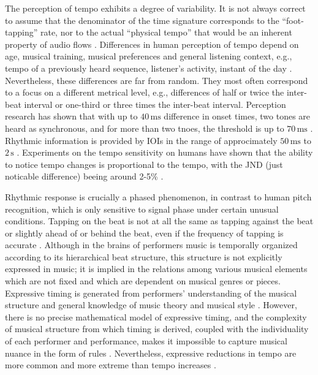 \documentclass{scrartcl}
\begin{document}
The perception of tempo exhibits a degree of variability. It is not always correct to assume that the denominator of the time signature corresponds to the ``foot-tapping'' rate, nor to the actual ``physical tempo'' that would be an inherent property of audio flows \cite{Drake1999}. Differences in human perception of tempo depend on age, musical training, musical preferences and general listening context, e.g., tempo of a previously heard sequence, listener's activity, instant of the day \cite{Drake1993,Drake2000,Drake2000b}. Nevertheless, these differences are  far from random. They most often correspond to a focus on a different metrical level, e.g., differences of half or twice the inter-beat interval or one-third or three times the inter-beat interval. Perception research has shown that with up to $40\,\text{ms}$ difference in onset times, two tones are heard as synchronous, and for more than two tnoes, the threshold is up to $70\,\text{ms}$ \cite{Handel1989}. Rhythmic information is provided by IOIs in the range of approcimately $50\,\text{ms}$ to $2\,\text{s}$ \cite{Handel1989}. Experiments on the tempo sensitivity on humans have shown that the ability to notice tempo changes is proportional to the tempo, with the JND (just noticable difference) beeing around 2-5\% \cite{Drake1993}.

Rhythmic response is crucially a phased phenomenon, in contrast to human pitch recognition, which is only sensitive to signal phase under certain unusual conditions. Tapping on the beat is not at all the same as tapping against the beat or slightly ahead of or behind the beat, even if the frequency of tapping is accurate \cite{Scheirer1998}. Although in the brains of performers music is temporally organized according to its hierarchical beat structure, this structure is not explicitly expressed in music; it is implied in the relations among various musical elements which are not fixed and which are dependent on musical genres or pieces. Expressive timing is generated from performers' understanding of the musical structure and general knowledge of music theory and musical style \cite{Clarke1999}. However, there is no precise mathematical model of expressive timing, and the complexity of musical structure from which timing is derived, coupled with the individuality of each performer and performance, makes it impossible to capture musical nuance in the form of rules \cite{Dixon2001}. Nevertheless, expressive reductions in tempo are more common and more extreme than tempo increases \cite{Repp1994}. 
\end{document}
